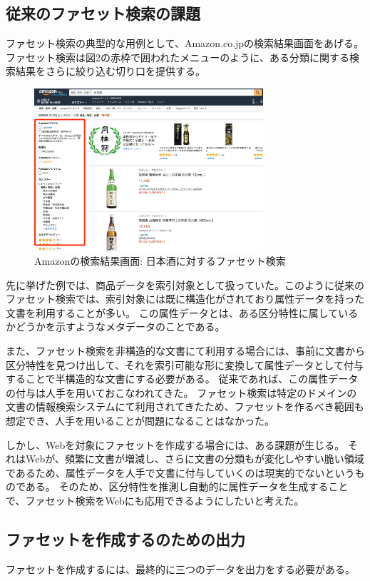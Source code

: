 \documentclass[a4j,10pt, twocolumn]{jarticle} \usepackage[dvipdfmx]{graphicx} \usepackage{amssymb} \usepackage{amsmath}
\begin{document}
\subsection{従来のファセット検索の課題}
 ファセット検索の典型的な用例として、Amazon.co.jp\cite{amazon}の検索結果画面をあげる。ファセット検索は図2の赤枠で囲われたメニューのように、ある分類に関する検索結果をさらに絞り込む切り口を提供する。
 \begin{figure}[ht]
   \includegraphics[width=85mm]{./amazon.png}
   \caption{Amazonの検索結果画面: 日本酒に対するファセット検索}
 \end{figure}
  先に挙げた例では、商品データを索引対象として扱っていた。このように従来のファセット検索では、索引対象には既に構造化がされており属性データを持った文書を利用することが多い。
  この属性データとは、ある区分特性に属しているかどうかを示すようなメタデータのことである。

  また、ファセット検索を非構造的な文書にて利用する場合には、事前に文書から区分特性を見つけ出して、それを索引可能な形に変換して属性データとして付与することで半構造的な文書にする必要がある。
  従来であれば、この属性データの付与は人手を用いておこなわれてきた。
  ファセット検索は特定のドメインの文書の情報検索システムにて利用されてきたため、ファセットを作るべき範囲も想定でき、人手を用いることが問題になることはなかった。

  しかし、Webを対象にファセットを作成する場合には、ある課題が生じる。
  それはWebが、頻繁に文書が増減し、さらに文書の分類もが変化しやすい脆い領域であるため、属性データを人手で文書に付与していくのは現実的でないというものである。
  そのため、区分特性を推測し自動的に属性データを生成することで、ファセット検索をWebにも応用できるようにしたいと考えた。

\subsection{ファセットを作成するのための出力}
ファセットを作成するには、最終的に三つのデータを出力をする必要がある。
\end{document}
